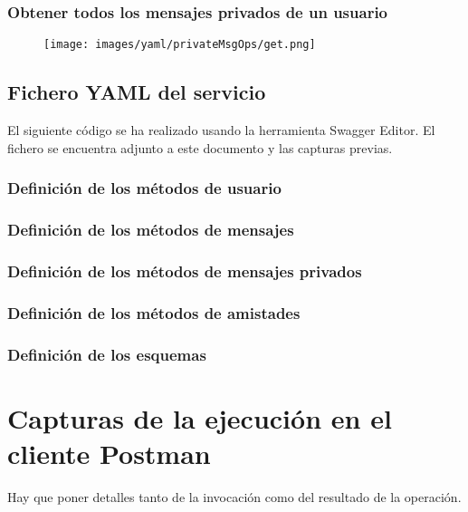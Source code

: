 \documentclass[12pt,a4paper, spanish]{article}
\begin{document}
\subsubsection{Obtener todos los mensajes privados de un usuario}
\begin{figure}[H]
	\centering
	\texttt{[image: images/yaml/privateMsgOps/get.png]}
\end{figure}

\newpage
\subsection{Fichero YAML del servicio}
El siguiente código se ha realizado usando la herramienta Swagger Editor. El fichero se encuentra adjunto a este documento y las capturas previas. 


\newpage
\subsubsection{Definición de los métodos de usuario}


\newpage
\subsubsection{Definición de los métodos de mensajes}


\newpage
\subsubsection{Definición de los métodos de mensajes privados}


\newpage
\subsubsection{Definición de los métodos de amistades}


\newpage
\subsubsection{Definición de los esquemas}


\newpage
\section{Capturas de la ejecución en el cliente Postman}
Hay que poner detalles tanto de la invocación como del resultado de la operación.
\end{document}
